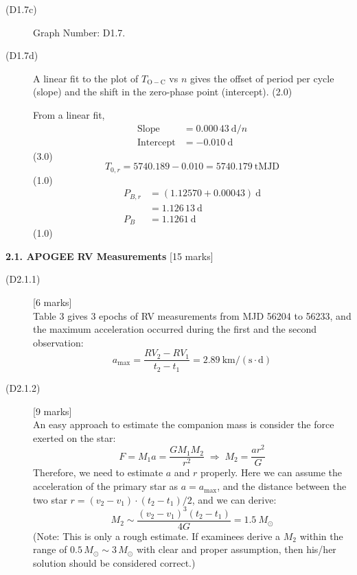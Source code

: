 \begin{description}
\item[(D1.7c)] Graph Number: D1.7.

\item[(D1.7d)] A linear fit to the plot of $T_{\mathrm{O-C}}$ vs $n$ gives
  the offset of period per cycle (slope) and the shift in the zero-phase
  point (intercept). \hfill(2.0)

  From a linear fit,
  \begin{align*}
    \mathrm{Slope} &= 0.000\,43\ \mathrm{d}/n \\
    \mathrm{Intercept} &= -0.010\ \mathrm{d}
  \end{align*}
  \hfill(3.0)
  \[ T_{0,r} = 5740.189 - 0.010 = 5740.179\ \mathrm{tMJD} \]
  \hfill(1.0)
  \begin{align*}
    P_{B,r} &= (1.12570 + 0.00043)\ \mathrm{d} \\
            &= 1.126\,13\ \mathrm{d} \\
    P_B &= 1.1261\ \mathrm{d}
  \end{align*}
  \hfill(1.0)
\end{description}


\noindent\textbf{2.1. APOGEE RV Measurements} \hfill[15 marks]

\begin{description}
\item[(D2.1.1)] \hfill[6 marks]\\
  Table 3 gives 3 epochs of RV measurements from MJD 56204 to 56233, and the
  maximum acceleration occurred during the first and the second observation:
  \[ a_{\max} = \frac{RV_2 - RV_1}{t_2 - t_1}
     = 2.89\ \mathrm{km/(s \cdot d)} \tag*{(15)} \]

\item[(D2.1.2)] \hfill[9 marks]\\
  An easy approach to estimate the companion mass is consider the force
  exerted on the star:
  \[ F = M_1 a = \frac{G M_1 M_2}{r^2}
     \;\Rightarrow\; M_2 = \frac{a r^2}{G} \tag*{(16)} \]
  Therefore, we need to estimate $a$ and $r$ properly. Here we can assume the
  acceleration of the primary star as $a = a_{\max}$, and the distance
  between the two star $r = (v_2 - v_1) \cdot (t_2 - t_1)/2$, and we can
  derive:
  \[ M_2 \sim \frac{(v_2 - v_1)^3 (t_2 - t_1)}{4G}
     = 1.5\ M_\odot \tag*{(17)} \]
  (Note: This is only a rough estimate. If examinees derive a $M_2$ within
  the range of $0.5\,M_\odot \sim 3\,M_\odot$ with clear and proper
  assumption, then his/her solution should be considered correct.)
\end{description}

